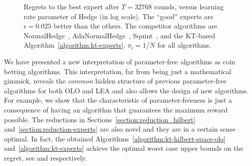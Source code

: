 \begin{figure}[t]
\centering
{}
\caption{\footnotesize{Regrets to the best expert after $T = 32768$ rounds,
versus learning rate parameter of Hedge (in log scale). The ``good'' experts
are $\epsilon=0.025$ better than the others. The competitor algorithms are
NormalHedge~\cite{Chaudhuri-Freund-Hsu-2009},
AdaNormalHedge~\cite{Luo-Schapire-2015}, Squint~\cite{Koolen-van-Erven-2015},
and the KT-based Algorithm~\ref{algorithm:kt-experts}. $\pi_i=1/N$ for all
algorithms.}}
\label{fig:exp_lea}
\end{figure}

We have presented a new interpretation of parameter-free algorithms as
coin betting algorithms. This interpretation, far from being just a
mathematical gimmick, reveals the \emph{common} hidden structure of previous
parameter-free algorithms for both OLO and LEA and also allows the design of new algorithms. For
example, we show that the characteristic of parameter-freeness is just a
consequence of having an algorithm that guarantees the maximum reward possible.
The reductions in Sections~\ref{section:reduction_hilbert}
and~\ref{section:reduction-experts} are also novel and they are in a certain
sense optimal. In fact, the obtained
Algorithms~\ref{algorithm:kt-hilbert-space-olo} and~\ref{algorithm:kt-experts}
achieve the optimal worst case upper bounds on the regret, see
\cite{Streeter-McMahan-2012,Orabona-2013} and \cite{Cesa-Bianchi-Lugosi-2006}
respectively.

